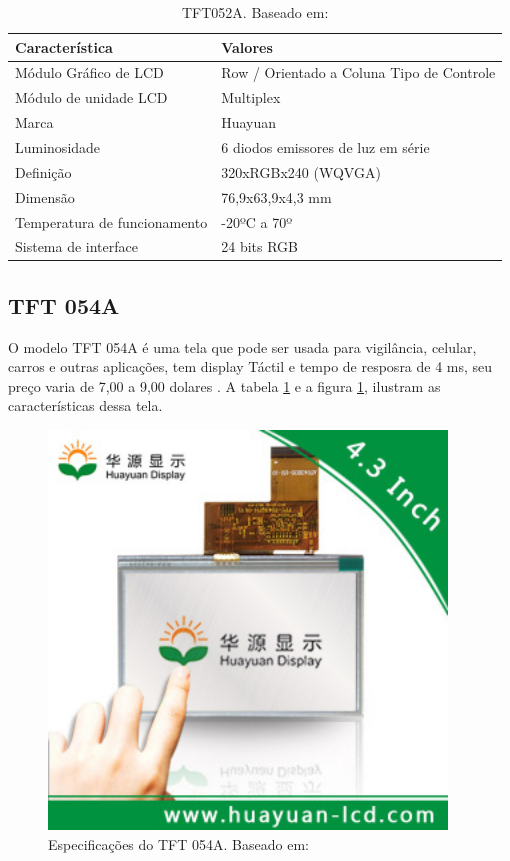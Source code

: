 \begin{table}[ht]
\caption{TFT052A. Baseado em: \cite{tela_resistiva}}
\centering
\begin{tabular}{| l |  p{10cm} |}
\hline
Característica & Valores \\
\hline
Módulo Gráfico de LCD & Row / Orientado a Coluna Tipo de Controle \\
\hline
Módulo de unidade LCD & Multiplex \\
\hline
Marca & Huayuan \\
\hline
Luminosidade & 6 diodos emissores de luz em série \\
\hline
Definição & 320xRGBx240 (WQVGA) \\
\hline
Dimensão & 76,9x63,9x4,3 mm \\
\hline
Temperatura de funcionamento & -20ºC a 70º\\
\hline
Sistema de interface & 24 bits RGB \\
\hline
\end{tabular}
\label{table:table_tela_resistiva}
\end{table}

\subsection{TFT 054A}
O modelo TFT 054A é uma tela que pode ser usada para vigilância, celular,
carros e outras aplicações, tem display Táctil e tempo de resposra de 4 ms,
seu preço varia de 7,00 a 9,00 dolares \cite{tft}. A tabela \ref{table:table_tela_resistiva} e a figura
\ref{fig:imagem_interface2}, ilustram
as características dessa tela.

\begin{figure}[h]
  \centering
  \includegraphics[width=400px, scale=1]{figuras/imagem_interface2}
  \caption{Especificações do TFT 054A. Baseado em: \cite{tft}}
\label{fig:imagem_interface2}
\end{figure}

